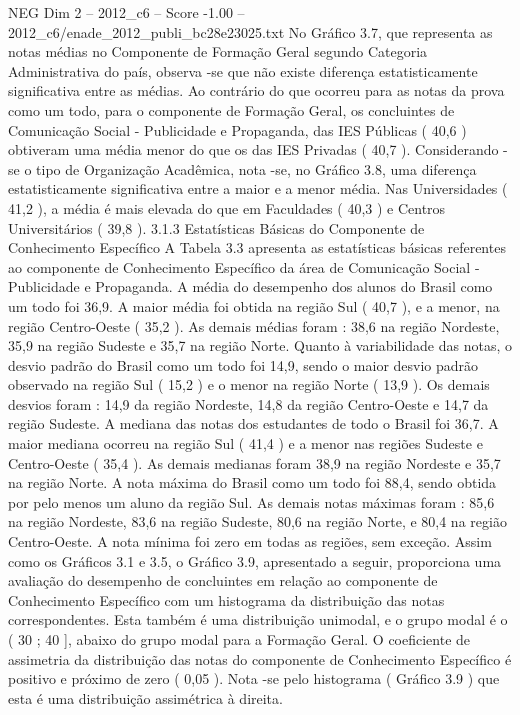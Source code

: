 \begin{textsample}{NEG Dim 2 – 2012\_c6 – Score -1.00 – 2012\_c6/enade\_2012\_publi\_bc28e23025.txt}
No Gráfico 3.7, que representa as notas médias no Componente de Formação Geral segundo Categoria Administrativa do país, observa -se que não existe diferença estatisticamente significativa entre as médias.
Ao contrário do que ocorreu para as notas da prova como um todo, para o componente de Formação Geral, os concluintes de Comunicação Social - Publicidade e Propaganda, das IES Públicas ( 40,6 ) obtiveram uma média menor do que os das IES Privadas ( 40,7 ).
Considerando -se o tipo de Organização Acadêmica, nota -se, no Gráfico 3.8, uma diferença estatisticamente significativa entre a maior e a menor média.
Nas Universidades ( 41,2 ), a média é mais elevada do que em Faculdades ( 40,3 ) e Centros Universitários ( 39,8 ). 3.1.3 Estatísticas Básicas do Componente de Conhecimento Específico A Tabela 3.3 apresenta as estatísticas básicas referentes ao componente de Conhecimento Específico da área de Comunicação Social - Publicidade e Propaganda.
A média do desempenho dos alunos do Brasil como um todo foi 36,9.
A maior média foi obtida na região Sul ( 40,7 ), e a menor, na região Centro-Oeste ( 35,2 ).
As demais médias foram : 38,6 na região Nordeste, 35,9 na região Sudeste e 35,7 na região Norte.
Quanto à variabilidade das notas, o desvio padrão do Brasil como um todo foi 14,9, sendo o maior desvio padrão observado na região Sul ( 15,2 ) e o menor na região Norte ( 13,9 ).
Os demais desvios foram : 14,9 da região Nordeste, 14,8 da região Centro-Oeste e 14,7 da região Sudeste.
A mediana das notas dos estudantes de todo o Brasil foi 36,7.
A maior mediana ocorreu na região Sul ( 41,4 ) e a menor nas regiões Sudeste e Centro-Oeste ( 35,4 ).
As demais medianas foram 38,9 na região Nordeste e 35,7 na região Norte.
A nota máxima do Brasil como um todo foi 88,4, sendo obtida por pelo menos um aluno da região Sul.
As demais notas máximas foram : 85,6 na região Nordeste, 83,6 na região Sudeste, 80,6 na região Norte, e 80,4 na região Centro-Oeste.
A nota mínima foi zero em todas as regiões, sem exceção.
Assim como os Gráficos 3.1 e 3.5, o Gráfico 3.9, apresentado a seguir, proporciona uma avaliação do desempenho de concluintes em relação ao componente de Conhecimento Específico com um histograma da distribuição das notas correspondentes.
Esta também é uma distribuição unimodal, e o grupo modal é o ( 30 ; 40 ], abaixo do grupo modal para a Formação Geral.
O coeficiente de assimetria da distribuição das notas do componente de Conhecimento Específico é positivo e próximo de zero ( 0,05 ).
Nota -se pelo histograma ( Gráfico 3.9 ) que esta é uma distribuição assimétrica à direita.

\end{textsample}
